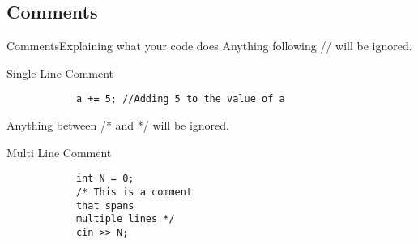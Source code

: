 \subsection{Comments}

\begin{frame}[fragile]{Comments}{Explaining what your code does}
    Anything following // will be ignored.
    \begin{block}{Single Line Comment}
        \begin{verbatim}
            a += 5; //Adding 5 to the value of a
        \end{verbatim}
    \end{block}
    Anything between /* and */ will be ignored.
    \begin{block}{Multi Line Comment}
        \begin{verbatim}
            int N = 0;
            /* This is a comment
            that spans
            multiple lines */
            cin >> N;
        \end{verbatim}
    \end{block}
\end{frame}
